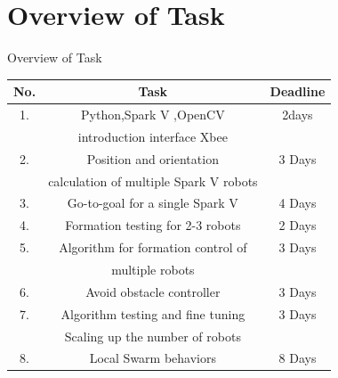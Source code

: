 \documentclass[11pt, a4paper]{beamer}
\begin{document}
\section{Overview of Task}
\begin{frame}{Overview of Task}

		\begin{tabular}{|c|c|c|}
			\hline
			\textbf{No.} & \textbf{Task} & \textbf{Deadline}\\
			\hline
			1.& Python,Spark V ,OpenCV&2days\\& introduction interface Xbee&   \\
			\hline
			2. & Position and orientation & 3 Days \\&calculation of multiple Spark V robots & \\
			\hline
			3. &  Go-to-goal for a single Spark V & 4 Days\\
			\hline
			4. &  Formation testing for 2-3 robots & 2 Days\\
			\hline
			5. &  Algorithm for formation control of  & 3 Days\\ &multiple robots & \\
			\hline
			6. & Avoid obstacle controller & 3 Days\\
			\hline
			7. & Algorithm testing and fine tuning & 3 Days\\ & Scaling up the number of robots & \\
			\hline
			8. & Local Swarm behaviors & 8 Days\\
			\hline
		\end{tabular}	
\end{frame}
\end{document}

